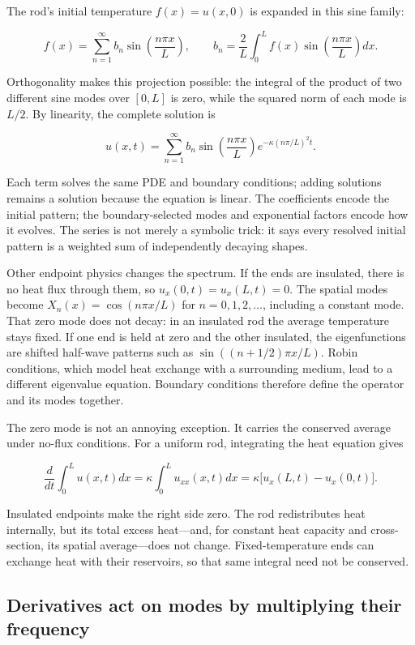 The rod's initial temperature \(f(x)=u(x,0)\) is expanded in this sine family:

\[
f(x)=\sum_{n=1}^{\infty}b_n\sin\left(\frac{n\pi x}{L}\right),
\qquad
b_n=\frac{2}{L}\int_0^L f(x)\sin\left(\frac{n\pi x}{L}\right)dx.
\]

Orthogonality makes this projection possible: the integral of the product of two different sine modes over \([0,L]\) is zero, while the squared norm of each mode is \(L/2\). By linearity, the complete solution is

\[
u(x,t)=\sum_{n=1}^{\infty}b_n\sin\left(\frac{n\pi x}{L}\right)e^{-\kappa(n\pi/L)^2t}.
\]

Each term solves the same PDE and boundary conditions; adding solutions remains a solution because the equation is linear. The coefficients encode the initial pattern; the boundary-selected modes and exponential factors encode how it evolves. The series is not merely a symbolic trick: it says every resolved initial pattern is a weighted sum of independently decaying shapes.

Other endpoint physics changes the spectrum. If the ends are insulated, there is no heat flux through them, so \(u_x(0,t)=u_x(L,t)=0\). The spatial modes become \(X_n(x)=\cos(n\pi x/L)\) for \(n=0,1,2,\ldots\), including a constant mode. That zero mode does not decay: in an insulated rod the average temperature stays fixed. If one end is held at zero and the other insulated, the eigenfunctions are shifted half-wave patterns such as \(\sin((n+1/2)\pi x/L)\). Robin conditions, which model heat exchange with a surrounding medium, lead to a different eigenvalue equation. Boundary conditions therefore define the operator and its modes together.

The zero mode is not an annoying exception. It carries the conserved average under no-flux conditions. For a uniform rod, integrating the heat equation gives

\[
\frac{d}{dt}\int_0^L u(x,t)dx
=\kappa\int_0^L u_{xx}(x,t)dx
=\kappa\big[u_x(L,t)-u_x(0,t)\big].
\]

Insulated endpoints make the right side zero. The rod redistributes heat internally, but its total excess heat---and, for constant heat capacity and cross-section, its spatial average---does not change. Fixed-temperature ends can exchange heat with their reservoirs, so that same integral need not be conserved.

\subsection{Derivatives act on modes by multiplying their frequency}\label{04-visual-computing-ii-ch030-derivatives-act-on-modes-by-multiplying-their-frequency}

